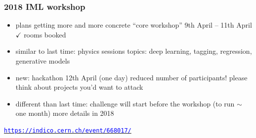 \documentclass[table,xcolor=dvipsnames,professionalfonts]{beamer}
\newcommand{\openref}[1]{\href{#1}{\footnotesize{\textcolor{blue}{\texttt{#1}}}}}
\begin{document}
\begin{frame}
  \frametitle{2018 IML workshop}
  \begin{itemize}
      \item plans getting more and more concrete
        \newline ``core workshop'' 9th April -- 11th April
        \newline $\checkmark$ rooms booked
      \item similar to last time: physics sessions
        \newline topics: deep learning, tagging, regression, generative models
      \item new: hackathon 12th April (one day)
        \newline reduced number of participants!
        \newline please think about projects you'd want to attack
      \item different than last time: challenge
        \newline will start before the workshop (to run $\sim$ one month)
        \newline more details in 2018
  \end{itemize}
  \openref{https://indico.cern.ch/event/668017/}
\end{frame}
\end{document}
